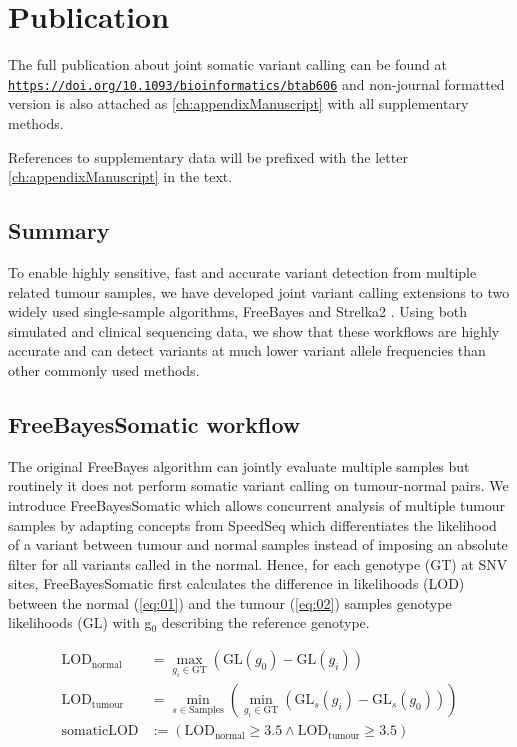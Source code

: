 \section{Publication}
\label{variantcalling-sec:publication}

The full publication about joint somatic variant calling can be found at \href{https://doi.org/10.1093/bioinformatics/btab606}{\nolinkurl{https://doi.org/10.1093/bioinformatics/btab606}} and non-journal formatted version is also attached as \autoref{ch:appendixManuscript} with all supplementary methods.

References to supplementary data will be prefixed with the letter \ref{ch:appendixManuscript} in the text.

\subsection{Summary}
To enable highly sensitive, fast and accurate variant detection from multiple related tumour samples, we have developed joint variant calling extensions to two widely used single-sample algorithms, FreeBayes \parencite{Garrison2012} and Strelka2 \parencite{Kim2018}. Using both simulated and clinical sequencing data, we show that these workflows are highly accurate and can detect variants at much lower variant allele frequencies than other commonly used methods.

\subsection{FreeBayesSomatic workflow}
The original FreeBayes algorithm can jointly evaluate multiple samples but routinely it does not perform somatic variant calling on tumour-normal pairs. We introduce FreeBayesSomatic which allows concurrent analysis of multiple tumour samples by adapting concepts from SpeedSeq \parencite{Chiang2015} which differentiates the likelihood of a variant between tumour and normal samples instead of imposing an absolute filter for all variants called in the normal. Hence, for each genotype (GT) at SNV sites, FreeBayesSomatic first calculates the difference in likelihoods (LOD) between the normal (\autoref{eq:01}) and the tumour (\autoref{eq:02}) samples genotype likelihoods (GL) with g$_{0}$ describing the reference genotype.


\begin{align}
\text{LOD}_{\text{normal}} &= \max_{g_i \in \text{GT}} \left( \text{GL}(g_0) - \text{GL}(g_i) \right) \label{eq:01}\\
\text{LOD}_{\text{tumour}} &= \min_{s \in \text{Samples}} \left( \min_{g_i \in \text{GT}} \left( \text{GL}_s(g_i) - \text{GL}_s(g_0) \right) \right) \label{eq:02}\\
\text{somaticLOD} & := \left( \text{LOD}_{\text{normal}} \geq 3.5 \land \text{LOD}_{\text{tumour}} \geq 3.5 \right) \label{eq:03}
\end{align}

